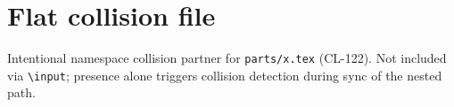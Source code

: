\section{Flat collision file}
\label{sec:flat}

Intentional namespace collision partner for \texttt{parts/x.tex} (CL-122).
Not included via \texttt{\textbackslash input}; presence alone triggers collision
detection during sync of the nested path.
